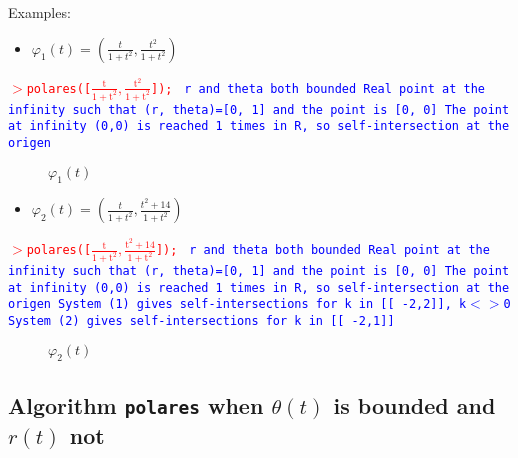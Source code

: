 \documentclass{elsart}
\begin{document}
Examples:

\begin{itemize}
  \item $\varphi_1(t)=( \frac{t}{1+t^2},\frac{t^2}{1+t^2})$
\end{itemize}

\texttt{\textcolor{red}{$>$polares([$\mathrm{\frac{t}{1+t^2},\frac{t^2}{1+t^2}}$]);}}\newline
\texttt{\textcolor{blue}{
 r and theta both bounded \newline
 Real point at the infinity such that (r, theta)=[0, 1] and the point is [0, 0] \newline
The point at infinity (0,0) is reached 1 times in R, so self-intersection at the origen}}

\begin{figure}[ht]
\begin{center}
\centerline{  }
\end{center}
\caption{$\varphi_1(t)$}\end{figure}
\begin{itemize}
  \item $\varphi_2(t)=( \frac{t}{1+t^2},\frac{t^2+14}{1+t^2})$
  \end{itemize}


  \texttt{\textcolor{red}{$>$polares([$\mathrm{\frac{t}{1+t^2},\frac{t^2+14}{1+t^2}}$]);}}\newline
\texttt{\textcolor{blue}{  r and theta both bounded \newline
Real point at the infinity such that (r, theta)=[0, 1] and the point is [0, 0] \newline
The point at infinity (0,0) is reached 1 times in R, so self-intersection at the origen \newline
System (1) gives self-intersections for  k in [[ -2,2]], k$<>$0\newline
System (2) gives self-intersections for k in [[ -2,1]]}}


  \begin{figure}[ht]
\begin{center}
\centerline{  }
\end{center}
\caption{$\varphi_2(t)$}
\end{figure}



\subsection{Algorithm {\tt polares} when $\theta(t)$ is bounded and $r(t)$ not}\label{3.2}
\end{document}
